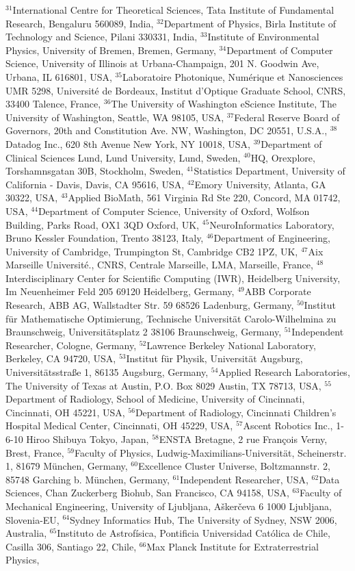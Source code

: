 $^{31}$International Centre for Theoretical Sciences, Tata Institute of Fundamental Research, Bengaluru 560089, India, $^{32}$Department of Physics, Birla Institute of Technology and Science, Pilani 330331, India, $^{33}$Institute of Environmental Physics, University of Bremen, Bremen, Germany, $^{34}$Department of Computer Science, University of Illinois at Urbana-Champaign, 201 N. Goodwin Ave, Urbana, IL 616801, USA, $^{35}$Laboratoire Photonique, Num\'erique et Nanosciences UMR 5298, Universit\'e de Bordeaux, Institut d'Optique Graduate School, CNRS, 33400 Talence, France, $^{36}$The University of Washington eScience Institute, The University of Washington, Seattle, WA 98105, USA, $^{37}$Federal Reserve Board of Governors,  20th and Constitution Ave. NW, Washington, DC 20551, U.S.A., $^{38}$Datadog Inc., 620 8th Avenue New York, NY 10018, USA, $^{39}$Department of Clinical Sciences Lund, Lund University, Lund, Sweden, $^{40}$HQ, Orexplore, Torshamnsgatan 30B, Stockholm, Sweden, $^{41}$Statistics Department, University of California - Davis, Davis, CA 95616, USA, $^{42}$Emory University, Atlanta, GA 30322, USA, $^{43}$Applied BioMath, 561 Virginia Rd Ste 220, Concord, MA 01742, USA, $^{44}$Department of Computer Science, University of Oxford, Wolfson Building, Parks Road, OX1 3QD Oxford, UK, $^{45}$NeuroInformatics Laboratory, Bruno Kessler Foundation, Trento 38123, Italy, $^{46}$Department of Engineering, University of Cambridge, Trumpington St, Cambridge CB2 1PZ, UK, $^{47}$Aix Marseille Universit\'e., CNRS, Centrale Marseille, LMA, Marseille, France, $^{48}$Interdisciplinary Center for Scientific Computing (IWR), Heidelberg University, Im Neuenheimer Feld 205 69120 Heidelberg, Germany, $^{49}$ABB Corporate Research, ABB AG, Wallstadter Str. 59 68526 Ladenburg, Germany, $^{50}$Institut f\"ur Mathematische Optimierung, Technische Universit\"at Carolo-Wilhelmina zu Braunschweig, Universit\"atsplatz 2 38106 Braunschweig, Germany, $^{51}$Independent Researcher, Cologne, Germany, $^{52}$Lawrence Berkeley National Laboratory, Berkeley, CA 94720, USA, $^{53}$Institut f{\"u}r Physik, Universit{\"a}t Augsburg, Universit{\"a}tsstra{\ss}e 1, 86135 Augsburg, Germany, $^{54}$Applied Research Laboratories, The University of Texas at Austin, P.O. Box 8029 Austin, TX 78713, USA, $^{55}$Department of Radiology, School of Medicine, University of Cincinnati, Cincinnati, OH 45221, USA, $^{56}$Department of Radiology, Cincinnati Children's Hospital Medical Center, Cincinnati, OH 45229, USA, $^{57}$Ascent Robotics Inc., 1-6-10 Hiroo Shibuya Tokyo, Japan, $^{58}$ENSTA Bretagne, 2 rue François Verny, Brest, France, $^{59}$Faculty of Physics, Ludwig-Maximilians-Universit\"at, Scheinerstr. 1, 81679 M\"unchen, Germany, $^{60}$Excellence Cluster Universe, Boltzmannstr. 2, 85748 Garching b. M\"unchen, Germany, $^{61}$Independent Researcher, USA, $^{62}$Data Sciences, Chan Zuckerberg Biohub, San Francisco, CA 94158, USA, $^{63}$Faculty of Mechanical Engineering, University of Ljubljana, A\v{s}ker\v{c}eva 6 1000 Ljubljana, Slovenia-EU, $^{64}$Sydney Informatics Hub, The University of Sydney, NSW 2006, Australia, $^{65}$Instituto de Astrof\'{i}sica, Pontificia Universidad Cat\'{o}lica de Chile, Casilla 306, Santiago 22, Chile, $^{66}$Max Planck Institute for Extraterrestrial Physics, 